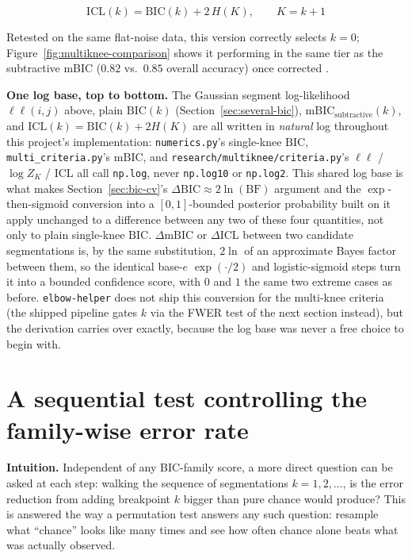 \documentclass[11pt]{article}
\newcommand{\code}[1]{\texttt{#1}}
\begin{document}
\begin{equation}
\mathrm{ICL}(k) = \mathrm{BIC}(k) + 2\,H(K), \qquad K = k+1
\end{equation}

Retested on the same flat-noise data, this version correctly selects $k =
0$; Figure~\ref{fig:multiknee-comparison} shows it performing in the same
tier as the subtractive mBIC ($0.82$ vs.\ $0.85$ overall accuracy) once
corrected
\citep{biernacki2000}.

\textbf{One log base, top to bottom.} The Gaussian segment log-likelihood
$\ell\ell(i,j)$ above, plain $\mathrm{BIC}(k)$ (Section~\ref{sec:several-bic}),
$\mathrm{mBIC}_{\text{subtractive}}(k)$, and $\mathrm{ICL}(k) =
\mathrm{BIC}(k) + 2H(K)$ are all written in \emph{natural} log throughout
this project's implementation: \code{numerics.py}'s single-knee
$\mathrm{BIC}$, \code{multi\_criteria.py}'s $\mathrm{mBIC}$, and
\code{research/multiknee/criteria.py}'s $\ell\ell$ / $\log Z_K$ / ICL all
call \code{np.log}, never \code{np.log10} or \code{np.log2}. This shared
log base is what makes
Section~\ref{sec:bic-cv}'s $\Delta\mathrm{BIC} \approx 2\ln(\mathrm{BF})$
argument and the $\exp$-then-sigmoid conversion into a $[0,1]$-bounded
posterior probability built on it apply unchanged to a difference between
any two of these four quantities, not only to plain single-knee
$\mathrm{BIC}$. $\Delta\mathrm{mBIC}$ or $\Delta\mathrm{ICL}$ between two
candidate segmentations is, by the same substitution, $2\ln$ of an
approximate Bayes factor between them, so the identical base-$e$
$\exp(\cdot/2)$ and logistic-sigmoid steps turn it into a bounded
confidence score, with $0$ and $1$ the same two extreme cases as before.
\code{elbow-helper} does not ship this conversion for the multi-knee
criteria (the shipped pipeline gates $k$ via the FWER test of the next
section instead), but the derivation carries over exactly, because the log
base was never a free choice to begin with.

\section{A sequential test controlling the family-wise error rate}
\label{sec:fwer}

\textbf{Intuition.} Independent of any BIC-family score, a more direct
question can be asked at each step: walking the sequence of segmentations
$k = 1, 2, \dots$, is the error reduction from adding breakpoint $k$ bigger
than pure chance would produce? This is answered the way a permutation
test answers any such question: resample what ``chance'' looks like many
times and see how often chance alone beats what was actually observed.
\end{document}
